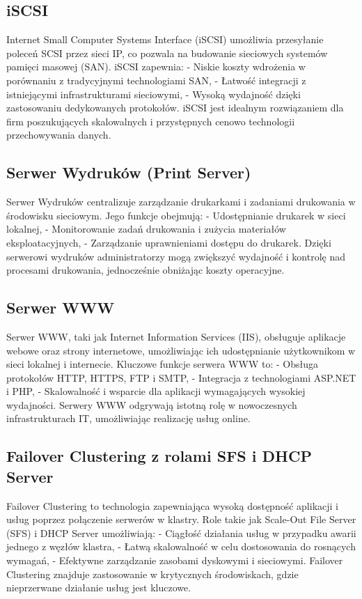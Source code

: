\subsection{iSCSI}
Internet Small Computer Systems Interface (iSCSI) umożliwia przesyłanie poleceń SCSI przez sieci IP, co pozwala na budowanie sieciowych systemów pamięci masowej (SAN). iSCSI zapewnia:
- Niskie koszty wdrożenia w porównaniu z tradycyjnymi technologiami SAN,
- Łatwość integracji z istniejącymi infrastrukturami sieciowymi,
- Wysoką wydajność dzięki zastosowaniu dedykowanych protokołów.
iSCSI jest idealnym rozwiązaniem dla firm poszukujących skalowalnych i przystępnych cenowo technologii przechowywania danych.

\subsection{Serwer Wydruków (Print Server)}
Serwer Wydruków centralizuje zarządzanie drukarkami i zadaniami drukowania w środowisku sieciowym. Jego funkcje obejmują:
- Udostępnianie drukarek w sieci lokalnej,
- Monitorowanie zadań drukowania i zużycia materiałów eksploatacyjnych,
- Zarządzanie uprawnieniami dostępu do drukarek.
Dzięki serwerowi wydruków administratorzy mogą zwiększyć wydajność i kontrolę nad procesami drukowania, jednocześnie obniżając koszty operacyjne.

\subsection{Serwer WWW}
Serwer WWW, taki jak Internet Information Services (IIS), obsługuje aplikacje webowe oraz strony internetowe, umożliwiając ich udostępnianie użytkownikom w sieci lokalnej i internecie. Kluczowe funkcje serwera WWW to:
- Obsługa protokołów HTTP, HTTPS, FTP i SMTP,
- Integracja z technologiami ASP.NET i PHP,
- Skalowalność i wsparcie dla aplikacji wymagających wysokiej wydajności.
Serwery WWW odgrywają istotną rolę w nowoczesnych infrastrukturach IT, umożliwiając realizację usług online.

\subsection{Failover Clustering z rolami SFS i DHCP Server}
Failover Clustering to technologia zapewniająca wysoką dostępność aplikacji i usług poprzez połączenie serwerów w klastry. Role takie jak Scale-Out File Server (SFS) i DHCP Server umożliwiają:
- Ciągłość działania usług w przypadku awarii jednego z węzłów klastra,
- Łatwą skalowalność w celu dostosowania do rosnących wymagań,
- Efektywne zarządzanie zasobami dyskowymi i sieciowymi.
Failover Clustering znajduje zastosowanie w krytycznych środowiskach, gdzie nieprzerwane działanie usług jest kluczowe.


